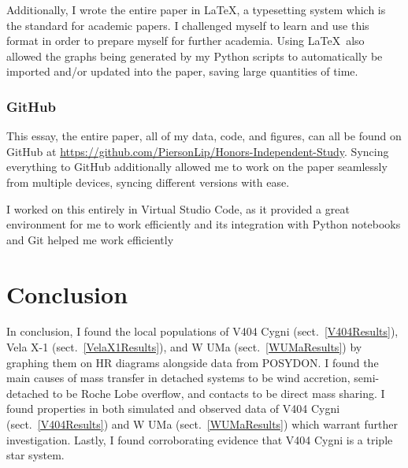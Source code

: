 \documentclass[12pt, a4paper]{article}
\begin{document}
            Additionally, I wrote the entire paper in \LaTeX, a typesetting system which is the standard for academic papers. I challenged myself to learn and use this format in order to prepare myself for further academia. Using \LaTeX~also allowed the graphs being generated by my Python scripts to automatically be imported and/or updated into the paper, saving large quantities of time.

        \subsubsection{GitHub}\label{GitHub}
            This essay, the entire paper, all of my data, code, and figures, can all be found on GitHub at \url{https://github.com/PiersonLip/Honors-Independent-Study}. Syncing everything to GitHub additionally allowed me to work on the paper seamlessly from multiple devices, syncing different versions with ease. 

            I worked on this entirely in Virtual Studio Code, as it provided a great environment for me to work efficiently and its integration with Python notebooks and Git helped me work efficiently

\section{Conclusion}
    In conclusion, I found the local populations of V404 Cygni (sect.~\ref{V404Results}), Vela X-1 (sect.~\ref{VelaX1Results}), and W UMa (sect.~\ref{WUMaResults}) by graphing them on HR diagrams alongside data from POSYDON. I found the main causes of mass transfer in detached systems to be wind accretion, semi-detached to be Roche Lobe overflow, and contacts to be direct mass sharing. I found properties in both simulated and observed data of V404 Cygni (sect.~\ref{V404Results}) and W UMa (sect.~\ref{WUMaResults}) which warrant further investigation. Lastly, I found corroborating evidence that V404 Cygni is a triple star system.


    \pagebreak
\printbibliography[
heading=bibintoc,
title={\centering Works Cited}
]
\end{document}
